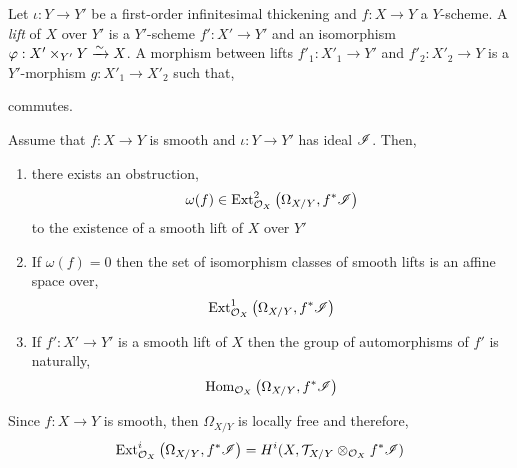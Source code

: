 \documentclass[12pt]{article}
\begin{document}
\begin{defn}
Let $\iota : Y \to Y'$ be a first-order infinitesimal thickening and $f : X \to Y$ a $Y$-scheme. A \textit{lift} of $X$ over $Y'$ is a $Y'$-scheme $f' : X' \to Y'$ and an isomorphism $\varphi : X' \times_{Y'} Y \xrightarrow{\sim} X$. A morphism between lifts $f'_1 : X'_1 \to Y'$ and $f'_2 : X'_2 \to Y$ is a $Y'$-morphism $g : X'_1 \to X'_2$ such that,
\begin{center}
\end{center}
commutes.
\end{defn}

\begin{prop}
Assume that $f : X \to Y$ is smooth and $\iota : Y \to Y'$ has ideal $\mathscr{I}$. Then,
\begin{enumerate}
\item there exists an obstruction,
\[ \omega(f) \in \mathrm{Ext}^{2}_{\mathcal{O}_{X}} \left( \Omega_{X/Y}, f^*\mathscr{I} \right) \]
to the existence of a smooth lift of $X$ over $Y'$
\item If $\omega(f) = 0$ then the set of isomorphism classes of smooth lifts is an affine space over,
\[ \mathrm{Ext}^{1}_{\mathcal{O}_{X}} \left( \Omega_{X/Y}, f^* \mathscr{I} \right) \]
\item If $f' : X' \to Y'$ is a smooth lift of $X$ then the group of automorphisms of $f'$ is naturally, 
\[ \mathrm{Hom}_{\mathcal{O}_{X}} \left( \Omega_{X/Y}, f^* \mathscr{I} \right) \]
\end{enumerate}
\end{prop}

\newcommand{\X}{\mathcal{X}}
\newcommand{\Zar}{\mathrm{Zar}}

\begin{rmk}
Since $f : X \to Y$ is smooth, then $\Omega_{X/Y}$ is locally free and therefore,
\[ \mathrm{Ext}^{i}_{\mathcal{O}_{X}} \left( \Omega_{X/Y}, f^* \mathscr{I} \right) = H^i(X, \mathcal{T}_{X/Y} \otimes_{\mathcal{O}_{X}} f^* \mathscr{I}) \]
\end{rmk}
\end{document}
